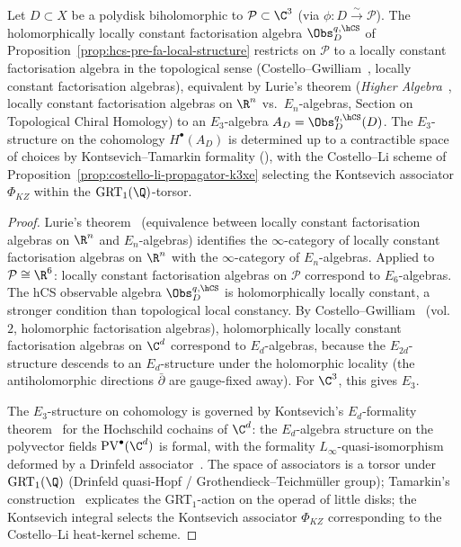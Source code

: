\begin{proposition}
\label{prop:lurie-kt-formality-e3-local}
Let $D \subset X$ be a polydisk biholomorphic to $\mathcal{P} \subset \C^3$
\textup{(}via $\phi: D \xrightarrow{\sim} \mathcal{P}$\textup{).} The
holomorphically locally constant factorisation algebra
$\Obs^{q,\hCS}_D$ of Proposition~\ref{prop:hcs-pre-fa-local-structure}
restricts on $\mathcal{P}$ to a locally constant factorisation algebra
in the topological sense \textup{(}Costello--Gwilliam~\cite{CostelloGwilliam},
locally constant factorisation algebras\textup{)}, equivalent by Lurie's theorem
\textup{(}\emph{Higher Algebra}~\cite{LurieHA}, locally constant
factorisation algebras on $\R^n$ vs.\ $E_n$-algebras, Section on Topological Chiral Homology\textup{)}
to an $E_3$-algebra $A_D = \Obs^{q,\hCS}_D(D)$. The $E_3$-structure on
the cohomology $H^\bullet(A_D)$ is determined up to a contractible space
of choices by Kontsevich--Tamarkin formality
\textup{(\cite{Kontsevich1999, Tamarkin1998})}, with the
Costello--Li scheme of Proposition~\ref{prop:costello-li-propagator-k3xe}
selecting the Kontsevich associator $\Phi_{KZ}$ within the
$\mathrm{GRT}_1(\Q)$-torsor.
\end{proposition}

\begin{proof}
Lurie's theorem~\cite{LurieHA} \textup{(}equivalence between locally
constant factorisation algebras on $\R^n$ and $E_n$-algebras\textup{)}
identifies the $\infty$-category of locally constant factorisation
algebras on $\R^n$ with the $\infty$-category of $E_n$-algebras.
Applied to $\mathcal{P} \cong \R^6$: locally constant factorisation
algebras on $\mathcal{P}$ correspond to $E_6$-algebras. The hCS
observable algebra $\Obs^{q,\hCS}_D$ is holomorphically locally
constant, a stronger condition than topological local constancy. By
Costello--Gwilliam~\cite{CostelloGwilliam} \textup{(}vol.~$2$, holomorphic
factorisation algebras\textup{)}, holomorphically locally constant
factorisation algebras on $\C^d$ correspond to $E_d$-algebras, because
the $E_{2d}$-structure descends to an $E_d$-structure under the
holomorphic locality \textup{(}the antiholomorphic directions
$\bar\partial$ are gauge-fixed away\textup{).} For $\C^3$, this gives
$E_3$.

The $E_3$-structure on cohomology is governed by Kontsevich's
$E_d$-formality theorem~\cite{Kontsevich1999} for the Hochschild
cochains of $\C^d$: the $E_d$-algebra structure on the polyvector
fields $\mathrm{PV}^\bullet(\C^d)$ is formal, with the formality
$L_\infty$-quasi-isomorphism deformed by a Drinfeld
associator~\cite{Tamarkin1998}. The space of associators is a torsor
under $\mathrm{GRT}_1(\Q)$ \cite{Drinfeld1990} \textup{(}Drinfeld
quasi-Hopf / Grothendieck--Teichm\"uller group\textup{);} Tamarkin's
construction~\cite{Tamarkin2003} explicates the GRT$_1$-action on the
operad of little disks; the Kontsevich integral selects the Kontsevich
associator $\Phi_{KZ}$ corresponding to the Costello--Li heat-kernel
scheme.
\end{proof}


